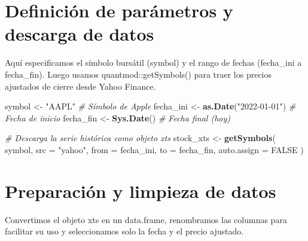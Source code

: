 \documentclass[
  11pt,
]{book}
\newenvironment{Shaded}{\begin{snugshade}}{\end{snugshade}}
\newcommand{\AttributeTok}[1]{\textcolor[rgb]{0.13,0.29,0.53}{#1}}
\newcommand{\CommentTok}[1]{\textcolor[rgb]{0.56,0.35,0.01}{\textit{#1}}}
\newcommand{\ConstantTok}[1]{\textcolor[rgb]{0.56,0.35,0.01}{#1}}
\newcommand{\FunctionTok}[1]{\textcolor[rgb]{0.13,0.29,0.53}{\textbf{#1}}}
\newcommand{\NormalTok}[1]{#1}
\newcommand{\OtherTok}[1]{\textcolor[rgb]{0.56,0.35,0.01}{#1}}
\newcommand{\StringTok}[1]{\textcolor[rgb]{0.31,0.60,0.02}{#1}}
\begin{document}
\section{Definición de parámetros y descarga de datos}\label{definiciuxf3n-de-paruxe1metros-y-descarga-de-datos}

Aquí especificamos el símbolo bursátil (symbol) y el rango de fechas (fecha\_ini a fecha\_fin). Luego usamos quantmod::getSymbols() para traer los precios ajustados de cierre desde Yahoo Finance.

\begin{Shaded}
\begin{Highlighting}[]
\NormalTok{symbol    }\OtherTok{\textless{}{-}} \StringTok{"AAPL"}                    \CommentTok{\# Símbolo de Apple}
\NormalTok{fecha\_ini }\OtherTok{\textless{}{-}} \FunctionTok{as.Date}\NormalTok{(}\StringTok{"2022{-}01{-}01"}\NormalTok{)     }\CommentTok{\# Fecha de inicio}
\NormalTok{fecha\_fin }\OtherTok{\textless{}{-}} \FunctionTok{Sys.Date}\NormalTok{()                }\CommentTok{\# Fecha final (hoy)}

\CommentTok{\# Descarga la serie histórica como objeto xts}
\NormalTok{stock\_xts }\OtherTok{\textless{}{-}} \FunctionTok{getSymbols}\NormalTok{(}
\NormalTok{  symbol,}
  \AttributeTok{src         =} \StringTok{"yahoo"}\NormalTok{,}
  \AttributeTok{from        =}\NormalTok{ fecha\_ini,}
  \AttributeTok{to          =}\NormalTok{ fecha\_fin,}
  \AttributeTok{auto.assign =} \ConstantTok{FALSE}
\NormalTok{)}
\end{Highlighting}
\end{Shaded}

\section{Preparación y limpieza de datos}\label{preparaciuxf3n-y-limpieza-de-datos}

Convertimos el objeto xts en un data.frame, renombramos las columnas para facilitar su uso y seleccionamos solo la fecha y el precio ajustado.
\end{document}
